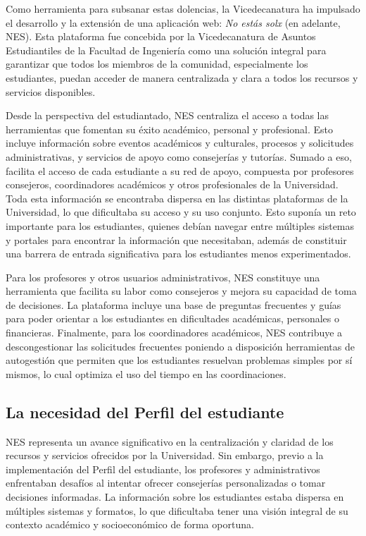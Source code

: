 Como herramienta para subsanar estas dolencias, la Vicedecanatura ha impulsado el desarrollo y la extensión de una aplicación web: \textit{No estás solx} (en adelante, \gls{NES}). Esta plataforma fue concebida por la Vicedecanatura de Asuntos Estudiantiles de la Facultad de Ingeniería como una solución integral para garantizar que todos los miembros de la comunidad, especialmente los estudiantes, puedan acceder de manera centralizada y clara a todos los recursos y servicios disponibles.

Desde la perspectiva del estudiantado, \gls{NES} centraliza el acceso a todas las herramientas que fomentan su éxito académico, personal y profesional. Esto incluye información sobre eventos académicos y culturales, procesos y solicitudes administrativas, y servicios de apoyo como consejerías y tutorías. Sumado a eso, facilita el acceso de cada estudiante a su red de apoyo, compuesta por profesores consejeros, coordinadores académicos y otros profesionales de la Universidad. Toda esta información se encontraba dispersa en las distintas plataformas de la Universidad, lo que dificultaba su acceso y su uso conjunto. Esto suponía un reto importante para los estudiantes, quienes debían navegar entre múltiples sistemas y portales para encontrar la información que necesitaban, además de constituir una barrera de entrada significativa para los estudiantes menos experimentados.

Para los profesores y otros usuarios administrativos, \gls{NES} constituye una herramienta que facilita su labor como consejeros y mejora su capacidad de toma de decisiones. La plataforma incluye una base de preguntas frecuentes y guías para poder orientar a los estudiantes en dificultades académicas, personales o financieras. Finalmente, para los coordinadores académicos, \gls{NES} contribuye a descongestionar las solicitudes frecuentes poniendo a disposición herramientas de autogestión que permiten que los estudiantes resuelvan problemas simples por sí mismos, lo cual optimiza el uso del tiempo en las coordinaciones.

\subsection{La necesidad del Perfil del estudiante}

\gls{NES} representa un avance significativo en la centralización y claridad de los recursos y servicios ofrecidos por la Universidad. Sin embargo, previo a la implementación del Perfil del estudiante, los profesores y administrativos enfrentaban desafíos al intentar ofrecer consejerías personalizadas o tomar decisiones informadas. La información sobre los estudiantes estaba dispersa en múltiples sistemas y formatos, lo que dificultaba tener una visión integral de su contexto académico y socioeconómico de forma oportuna.

